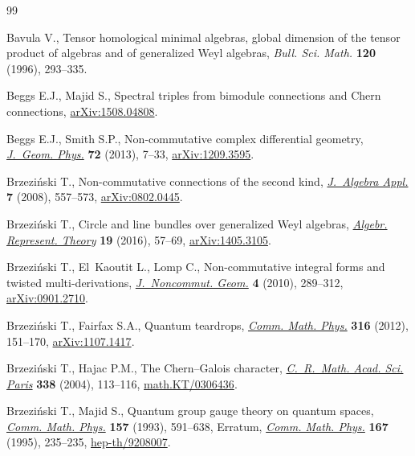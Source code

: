 \begin{thebibliography}{99}
\footnotesize\itemsep=0pt

Bavula V., Tensor homological minimal algebras, global dimension of the tensor
 product of algebras and of generalized {W}eyl algebras, \textit{Bull. Sci.
 Math.} \textbf{120} (1996), 293--335.

Beggs E.J., Majid S., Spectral triples from bimodule connections and {C}hern
 connections, \href{http://arxiv.org/abs/1508.04808}{arXiv:1508.04808}.

Beggs E.J., Smith S.P., Non-commutative complex dif\/ferential geometry,
 \href{http://dx.doi.org/10.1016/j.geomphys.2013.03.018}{\textit{J.~Geom. Phys.}} \textbf{72} (2013), 7--33, \href{http://arxiv.org/abs/1209.3595}{arXiv:1209.3595}.

Brzezi{\'n}ski T., Non-commutative connections of the second kind,
 \href{http://dx.doi.org/10.1142/S0219498808002977}{\textit{J.~Algebra Appl.}} \textbf{7} (2008), 557--573, \href{http://arxiv.org/abs/0802.0445}{arXiv:0802.0445}.

Brzezi{\'n}ski T., Circle and line bundles over generalized {W}eyl algebras,
 \href{http://dx.doi.org/10.1007/s10468-015-9562-7}{\textit{Algebr. Represent. Theory}} \textbf{19} (2016), 57--69,
 \href{http://arxiv.org/abs/1405.3105}{arXiv:1405.3105}.

Brzezi{\'n}ski T., El~Kaoutit L., Lomp C., Non-commutative integral forms and
 twisted multi-derivations, \href{http://dx.doi.org/10.4171/JNCG/56}{\textit{J.~Noncommut. Geom.}} \textbf{4} (2010),
 289--312, \href{http://arxiv.org/abs/0901.2710}{arXiv:0901.2710}.

Brzezi{\'n}ski T., Fairfax S.A., Quantum teardrops, \href{http://dx.doi.org/10.1007/s00220-012-1580-2}{\textit{Comm. Math. Phys.}}
 \textbf{316} (2012), 151--170, \href{http://arxiv.org/abs/1107.1417}{arXiv:1107.1417}.

Brzezi{\'n}ski T., Hajac P.M., The {C}hern--{G}alois character,
 \href{http://dx.doi.org/10.1016/j.crma.2003.11.009}{\textit{C.~R.~Math. Acad. Sci. Paris}} \textbf{338} (2004), 113--116,
 \href{http://arxiv.org/abs/math.KT/0306436}{math.KT/0306436}.

Brzezi{\'n}ski T., Majid S., Quantum group gauge theory on quantum spaces,
 \href{http://dx.doi.org/10.1007/BF02096884}{\textit{Comm. Math. Phys.}} \textbf{157} (1993), 591--638, {E}rratum,
 \href{http://dx.doi.org/10.1007/BF02099359}{\textit{Comm. Math. Phys.}}
 \textbf{167} (1995), 235--235, \href{http://arxiv.org/abs/hep-th/9208007}{hep-th/9208007}.


\end{thebibliography}
